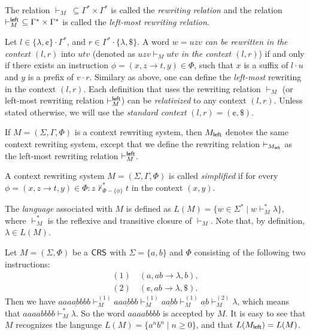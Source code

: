 \begin{definition}
The relation $\vdash_M \ \subseteq \Gamma^* \times \Gamma^*$ is called the \emph{rewriting relation} and the relation $\vdash^{\sf left}_M \ \subseteq \Gamma^* \times \Gamma^*$ is called the \emph{left-most rewriting relation}.

Let $l \in \{\lambda, \cent\} \cdot \Gamma^*$, and $r \in \Gamma^* \cdot \{\lambda, \$\}$. A word $w = uzv$ \emph{can be rewritten in the context $(l, r)$} into $utv$ (denoted as $uzv \vdash_M utv$ \emph{in the context $(l, r)$}) if and only if there exists an instruction $\phi = (x, z \to t, y) \in \Phi$, such that $x$ is a suffix of $l \cdot u$ and $y$ is a prefix of $v \cdot r$. Similary as above, one can define the \emph{left-most} rewriting in the context $(l, r)$. Each definition that uses the rewriting relation $\vdash_M$ (or left-most rewriting relation $\vdash^{\sf left}_M$) can be \emph{relativized} to any context $(l, r)$. Unless stated otherwise, we will use the \emph{standard context} $(l, r) = (\cent, \$)$.

If $M = (\Sigma, \Gamma, \Phi)$ is a context rewriting system, then $M_{\sf left}$ denotes the same context rewriting system, except that we define the rewriting relation $\vdash_{M_{\sf left}}$ as the left-most rewriting relation $\vdash^{\sf left}_M$.

A context rewriting system $M = (\Sigma, \Gamma, \Phi)$ is called \emph{simplified} if for every $\phi = (x, z \to t, y) \in \Phi: z \not\vdash_{\Phi - \{\phi\}}^* t$ in the context $(x, y)$.

The \emph{language} associated with $M$ is defined as $L(M) = \{w \in \Sigma^* \mid w \vdash_M^* \lambda \}$, where $\vdash_M^*$ is the reflexive and transitive closure of $\vdash_M$. Note that, by definition, $\lambda \in L(M)$.
\end{definition}

\begin{example}\label{example:a^n_b^n}
Let $M = (\Sigma, \Phi)$ be a $\textup{\sf CRS\/}$ with $\Sigma = \{a, b\}$ and $\Phi$ consisting of the following two instructions:
$$
\begin{array}{l}
(1) \quad (a, ab \to \lambda, b),\\
(2) \quad (\cent, ab \to \lambda, \$).
\end{array}
$$
Then we have $aaa\underline{ab}bbb \vdash^{(1)}_{M} aa\underline{ab}bb \vdash^{(1)}_{M} a\underline{ab}b \vdash^{(1)}_{M} \underline{ab} \vdash^{(2)}_{M} \lambda$, which means that $aaaabbbb \vdash_{M}^* \lambda$. So the word $aaaabbbb$ is accepted by $M$. It is easy to see that $M$ recognizes the language $L(M) = \{a^n b^n \mid n\ge 0\}$, and that $L(M_{\sf left}) = L(M)$.
\end{example}

